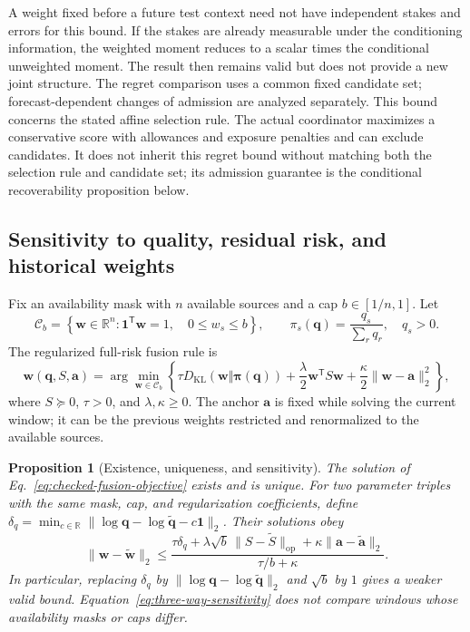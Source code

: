 \documentclass[10pt]{article}
\newtheorem{proposition}{Proposition}
\begin{document}
A weight fixed before a future test context need not have independent
stakes and errors for this bound. If the stakes are already measurable under
the conditioning information, the weighted moment reduces to a scalar times
the conditional unweighted moment. The result then remains valid but does not
provide a new joint structure. The regret comparison uses a common fixed
candidate set; forecast-dependent changes of admission are analyzed separately.
This bound concerns the stated affine selection rule. The actual coordinator
maximizes a conservative score with allowances and exposure penalties and can
exclude candidates. It does not inherit this regret bound without matching
both the selection rule and candidate set; its admission guarantee is the
conditional recoverability proposition below.

\subsection{Sensitivity to quality, residual risk, and historical weights}
\label{sec:joint-risk-theory}

Fix an availability mask with $n$ available sources and a cap
$b\in[1/n,1]$. Let
\begin{equation}
 \mathcal C_b=\left\{\boldsymbol w\in\mathbb R^n:
 \boldsymbol 1^{\mathsf T}\boldsymbol w=1,\quad 0\le w_s\le b\right\},
 \qquad
 \pi_s(\boldsymbol q)=\frac{q_s}{\sum_r q_r},\quad q_s>0.
\end{equation}
The regularized full-risk fusion rule is
\begin{equation}
 \boldsymbol w(\boldsymbol q,S,\boldsymbol a)=
 \arg\min_{\boldsymbol w\in\mathcal C_b}
 \left\{
 \tau D_{\mathrm{KL}}(\boldsymbol w\Vert\boldsymbol\pi(\boldsymbol q))
 +\frac{\lambda}{2}\boldsymbol w^{\mathsf T}S\boldsymbol w
 +\frac{\kappa}{2}\|\boldsymbol w-\boldsymbol a\|_2^2
 \right\},
 \label{eq:checked-fusion-objective}
\end{equation}
where $S\succeq0$, $\tau>0$, and $\lambda,\kappa\ge0$.
The anchor $\boldsymbol a$ is fixed while solving the current window; it can be
the previous weights restricted and renormalized to the available sources.

\begin{proposition}[Existence, uniqueness, and sensitivity]
\label{prop:fusion-sensitivity}
The solution of Eq.~\eqref{eq:checked-fusion-objective} exists and is unique.
For two parameter triples with the same mask, cap, and regularization
coefficients, define
$\delta_q=\min_{c\in\mathbb R}
 \|\log\boldsymbol q-\log\widetilde{\boldsymbol q}-c\boldsymbol1\|_2$.
Their solutions obey
\begin{equation}
 \|\boldsymbol w-\widetilde{\boldsymbol w}\|_2
 \le
 \frac{
  \tau\delta_q+
  \lambda\sqrt b\,\|S-\widetilde S\|_{\mathrm{op}}+
  \kappa\|\boldsymbol a-\widetilde{\boldsymbol a}\|_2
 }{\tau/b+\kappa}.
 \label{eq:three-way-sensitivity}
\end{equation}
In particular, replacing $\delta_q$ by
$\|\log\boldsymbol q-\log\widetilde{\boldsymbol q}\|_2$ and $\sqrt b$ by
$1$ gives a weaker valid bound. Equation~\eqref{eq:three-way-sensitivity}
does not compare windows whose availability masks or caps differ.
\end{proposition}
\end{document}
